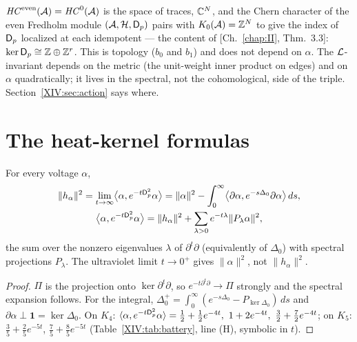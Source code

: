 \begin{remark}\label{XIV:rem:even}
$\mathit{HC}^{\mathrm{even}}(\mathcal{A})=\mathit{HC}^{0}(\mathcal{A})$ is the space of traces, $\mathbb{C}^{N}$, and the Chern
character of the even Fredholm module $(\mathcal{A},\mathcal{H},\mathsf{D}_p)$ pairs with $K_0(\mathcal{A})=\mathbb{Z}^{N}$ to give
the index of $\mathsf{D}_p$ localized at each idempotent --- the content of [Ch.~\ref{chap:II}, Thm.~3.3]:
$\ker\mathsf{D}_p\cong\mathbb{Z}\oplus\mathbb{Z}^{r}$. This is topology ($b_0$ and $b_1$) and does not depend on
$\alpha$. The $\mathcal{L}$-invariant depends on the metric (the unit-weight inner product on
edges) and on $\alpha$ quadratically; it lives in the spectral, not the cohomological, side
of the triple. Section~\ref{XIV:sec:action} says where.
\end{remark}

\section{The heat-kernel formulas}\label{XIV:sec:heat}

\begin{theorem}\label{XIV:thm:heat}
For every voltage $\alpha$,
\begin{gather*}
\|h_\alpha\|^{2}=\lim_{t\to\infty}\bigl\langle\alpha,e^{-t\mathsf{D}_p^{2}}\alpha\bigr\rangle
=\|\alpha\|^{2}-\int_0^{\infty}\bigl\langle\partial\alpha,e^{-s\Delta_0}\partial\alpha\bigr\rangle\,ds ,\\
\bigl\langle\alpha,e^{-t\mathsf{D}_p^{2}}\alpha\bigr\rangle=\|h_\alpha\|^{2}+\sum_{\lambda>0}e^{-t\lambda}\|P_\lambda\alpha\|^{2},
\end{gather*}
the sum over the nonzero eigenvalues $\lambda$ of $\partial^{t}\partial$ (equivalently of
$\Delta_0$) with spectral projections $P_\lambda$. The ultraviolet limit $t\to0^{+}$ gives
$\|\alpha\|^{2}$, not $\|h_\alpha\|^{2}$.
\end{theorem}

\begin{proof}
$\Pi$ is the projection onto $\ker\partial^{t}\partial$, so $e^{-t\partial^{t}\partial}\to\Pi$
strongly and the spectral expansion follows. For the integral,
$\Delta_0^{+}=\int_0^{\infty}(e^{-s\Delta_0}-P_{\ker\Delta_0})\,ds$ and $\partial\alpha\perp
\mathbf1=\ker\Delta_0$. On $K_4$: $\langle\alpha,e^{-t\mathsf{D}_p^{2}}\alpha\rangle=\frac12+\frac12e^{-4t},
\ 1+2e^{-4t},\ \frac32+\frac72e^{-4t}$; on $K_5$: $\frac35+\frac25e^{-5t}$,
$\frac75+\frac85e^{-5t}$ (Table~\ref{XIV:tab:battery}, line (H), symbolic in $t$).
\end{proof}

